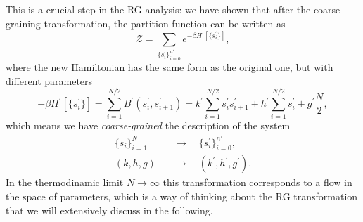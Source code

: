 This is a crucial step in the RG analysis: we have shown that after the coarse-graining transformation, the partition function can be written as
\[
    \mathcal{Z} = \sum_{\{s^{\prime}_i\}_{i=0}^{n'}} e^{-\beta H^{\prime}[\{s_i^{\prime}\}]},
\]
where the new Hamiltonian has the same form as the original one, but with different parameters
\[
    - \beta H^{\prime}[\{s_i^{\prime}\}] = \sum_{i=1}^{N/2} B^{\prime} (s_i^{\prime}, s_{i+1}^{\prime}) = k^{\prime} \sum_{i=1}^{N/2} s_i^{\prime} s_{i+1}^{\prime} + h^{\prime} \sum_{i=1}^{N/2} s_i^{\prime} + g^{\prime} \frac{N}{2},
\]
which means we have \textit{coarse-grained} the description of the system
\[
    \begin{aligned}
        \{s_i\}_{i=1}^{N} \quad & \to \quad \{s_i^{\prime}\}_{i=0}^{n'},          \\
        (k, h, g) \quad         & \to \quad (k^{\prime}, h^{\prime}, g^{\prime}).
    \end{aligned}
\]
In the thermodinamic limit \(N \to \infty\) this transformation corresponds to a flow in the space of parameters, which is a way of thinking about the RG transformation that we will extensively discuss in the following.

